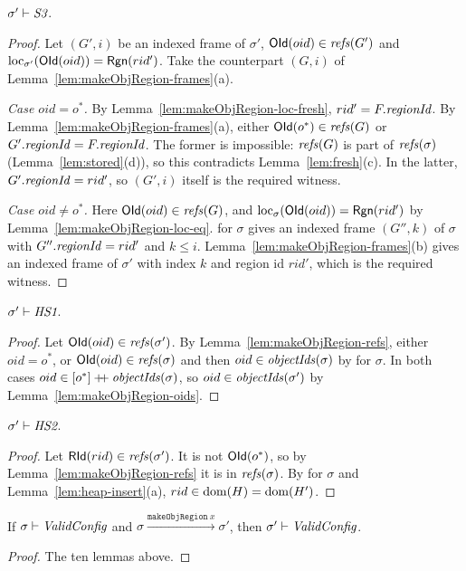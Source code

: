 \begin{lemma}[\inv{S3}] 
$\sigma' \vdash \textit{S3}$.
\end{lemma}
\begin{proof}
Let $(G', i)$ be an indexed frame of $\sigma'$, $\mathsf{OId}(oid) \in \mathit{refs}(G')$ and
$\mathrm{loc}_{\sigma'}(\mathsf{OId}(oid)) = \mathsf{Rgn}(rid')$. Take the counterpart $(G, i)$ of
Lemma~\ref{lem:makeObjRegion-frames}(a).

\emph{Case $oid = o^*$.} By Lemma~\ref{lem:makeObjRegion-loc-fresh}, $rid' = F.\mathit{regionId}$. By
Lemma~\ref{lem:makeObjRegion-frames}(a), either $\mathsf{OId}(o^*) \in \mathit{refs}(G)$ or $G'.\mathit{regionId} = F.\mathit{regionId}$. The
former is impossible: $\mathit{refs}(G)$ is part of $\mathit{refs}(\sigma)$ (Lemma~\ref{lem:stored}(d)), so this
contradicts Lemma~\ref{lem:fresh}(c). In the latter, $G'.\mathit{regionId} = rid'$, so $(G', i)$ itself is the
required witness.

\emph{Case $oid \ne o^*$.} Here $\mathsf{OId}(oid) \in \mathit{refs}(G)$, and
$\mathrm{loc}_{\sigma}(\mathsf{OId}(oid)) = \mathsf{Rgn}(rid')$ by Lemma~\ref{lem:makeObjRegion-loc-eq}.  for
$\sigma$ gives an indexed frame $(G'', k)$ of $\sigma$ with $G''.\mathit{regionId} = rid'$ and
$k \le i$. Lemma~\ref{lem:makeObjRegion-frames}(b) gives an indexed frame of $\sigma'$ with index $k$ and region id
$rid'$, which is the required witness.
\end{proof}

\begin{lemma}[\inv{HS1}] 
$\sigma' \vdash \textit{HS1}$.
\end{lemma}
\begin{proof}
Let $\mathsf{OId}(oid) \in \mathit{refs}(\sigma')$. By Lemma~\ref{lem:makeObjRegion-refs}, either $oid = o^*$, or
$\mathsf{OId}(oid) \in \mathit{refs}(\sigma)$ and then $oid \in \mathit{objectIds}(\sigma)$ by  for $\sigma$. In both
cases $oid \in [o^*] \mathbin{+\!\!+} \mathit{objectIds}(\sigma)$, so $oid \in \mathit{objectIds}(\sigma')$ by
Lemma~\ref{lem:makeObjRegion-oids}.
\end{proof}

\begin{lemma}[\inv{HS2}] 
$\sigma' \vdash \textit{HS2}$.
\end{lemma}
\begin{proof}
Let $\mathsf{RId}(rid) \in \mathit{refs}(\sigma')$. It is not $\mathsf{OId}(o^*)$, so by
Lemma~\ref{lem:makeObjRegion-refs} it is in $\mathit{refs}(\sigma)$. By  for $\sigma$ and
Lemma~\ref{lem:heap-insert}(a), $rid \in \mathrm{dom}(H) = \mathrm{dom}(H')$.
\end{proof}

\begin{theorem} 
If $\sigma \vdash \textit{ValidConfig}$ and $\sigma \xrightarrow{\texttt{makeObjRegion}\ x} \sigma'$,
then $\sigma' \vdash \textit{ValidConfig}$.
\end{theorem}
\begin{proof}
The ten lemmas above.
\end{proof}

